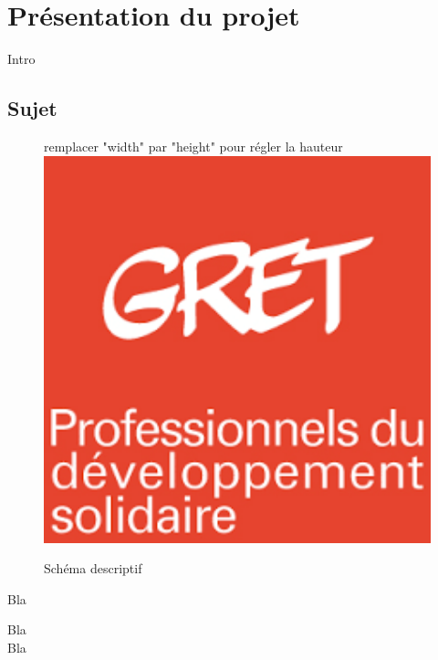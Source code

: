 \chapter{Présentation du projet}

Intro\footnotemark\\

\section{Sujet}

\begin{figure}
\begin{center}
remplacer "width" par "height" pour régler la hauteur
\includegraphics[width=15cm]{logo/GRET_logo}
\end{center}
\caption{Schéma descriptif}
\label{Tux}
\end{figure}

{}

Bla

Bla\\

Bla

